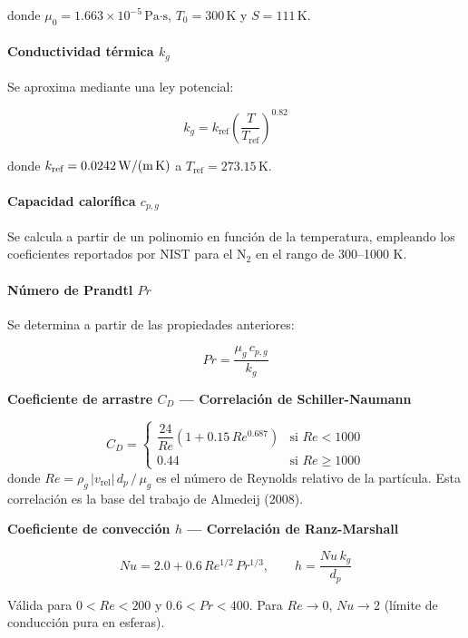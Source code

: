 \documentclass[11pt,stdletter,orderfromtodate,sigleft,twoside]{report}
\begin{document}
donde $\mu_0=1.663\times10^{-5}\,\text{Pa·s}$, $T_0=300\,\text{K}$ y $S=111\,\text{K}$.

\paragraph{Conductividad térmica $k_g$}
Se aproxima mediante una ley potencial:

\[
k_g = k_{\text{ref}}\left(\frac{T}{T_{\text{ref}}}\right)^{0.82}
\]

donde $k_{\text{ref}}=0.0242\,\text{W/(m\,K)}$ a $T_{\text{ref}}=273.15\,\text{K}$.

\paragraph{Capacidad calorífica $c_{p,g}$}
Se calcula a partir de un polinomio en función de la temperatura,
empleando los coeficientes reportados por NIST para el N$_2$ en el
rango de 300--1000 K.

\paragraph{Número de Prandtl $Pr$}
Se determina a partir de las propiedades anteriores:

\[
Pr = \frac{\mu_g\,c_{p,g}}{k_g}
\]
\medskip

\textbf{Coeficiente de arrastre $C_D$ --- Correlación de Schiller-Naumann}

\begin{equation}
  C_D =
  \begin{cases}
    \dfrac{24}{Re}\!\left(1 + 0.15\,Re^{0.687}\right) & \text{si } Re < 1000 \\[10pt]
    0.44 & \text{si } Re \geq 1000
  \end{cases}
  \label{eq:CD}
\end{equation}
donde $Re = \rho_g\,|v_\text{rel}|\,d_p\,/\,\mu_g$ es el número de Reynolds relativo de la partícula. Esta correlación es la base del trabajo de Almedeij (2008).
\medskip

\textbf{Coeficiente de convección $h$ --- Correlación de Ranz-Marshall}

\begin{equation}
  Nu = 2.0 + 0.6\,Re^{1/2}\,Pr^{1/3}, \qquad h = \frac{Nu\,k_g}{d_p}
  \label{eq:Nu}
\end{equation}

Válida para $0 < Re < 200$ y $0.6 < Pr < 400$. Para $Re \to 0$, $Nu \to 2$ (límite de conducción pura en esferas).
\end{document}
